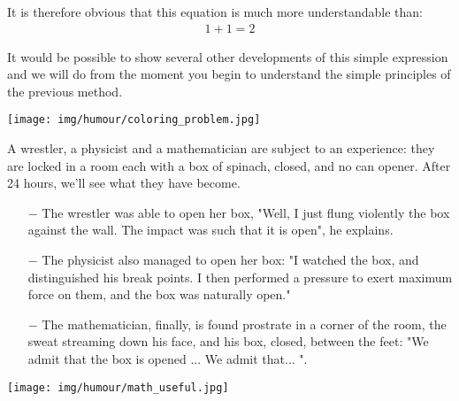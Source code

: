 	It is therefore obvious that this equation is much more understandable than:
	\begin{gather*}
	1+1=2
	\end{gather*}
	
	It would be possible to show several other developments of this simple expression and we will do from the moment you begin to understand the simple principles of the previous method.
	\begin{center}\underline{\hspace{5 cm}}\end{center}
	\begin{center}
		\texttt{[image: img/humour/coloring\_problem.jpg]}	
	\end{center}

	A wrestler, a physicist and a mathematician are subject to an experience: they are locked in a room each with a box of spinach, closed, and no can opener. After 24 hours, we'll see what they have become.
	
	\begin{itemize}	 
		\item[$-$] The wrestler was able to open her box, "Well, I just flung violently the box against the wall. The impact was such that it is open", he explains.
	
		\item[$-$] The physicist also managed to open her box: "I watched the box, and distinguished his break points. I then performed a pressure to exert maximum force on them, and the box was naturally open."
	
		\item[$-$] The mathematician, finally, is found prostrate in a corner of the room, the sweat streaming down his face, and his box, closed, between the feet: "We admit that the box is opened ... We admit that... ".
	\end{itemize}
	\begin{center}\underline{\hspace{5 cm}}\end{center}
	\begin{center}
		\texttt{[image: img/humour/math\_useful.jpg]}	
	\end{center}

